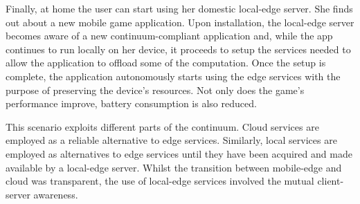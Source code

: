 Finally, at home the user can start using her domestic local-edge server. She finds out about a new mobile game application. Upon installation, the local-edge server becomes aware of a new continuum-compliant application and, while the app continues to run locally on her device, it proceeds to setup the services needed to allow the application to offload some of the computation. Once the setup is complete, the application autonomously starts using the edge services with the purpose of preserving the device's resources. Not only does the game's performance improve, battery consumption is also reduced.  

This scenario exploits different parts of the continuum. Cloud services are employed as a reliable alternative to edge services. Similarly, local services are employed as alternatives to edge services until they have been acquired and made available by a local-edge server. Whilst the transition between mobile-edge and cloud was transparent, the use of local-edge services involved the mutual client-server awareness.

